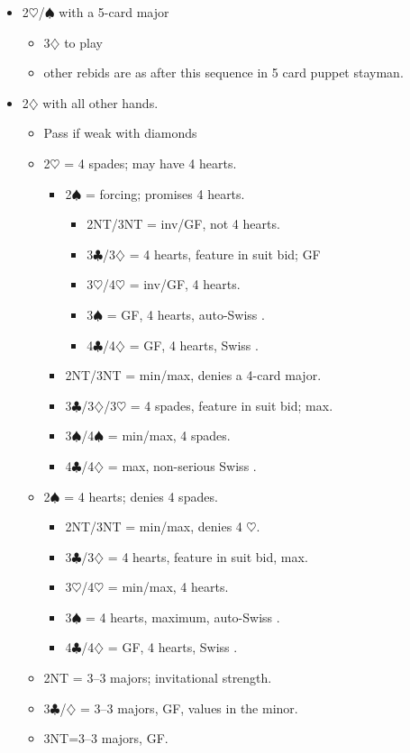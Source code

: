 \documentclass[a4paper,14pt]{extarticle}
\begin{document}
	\begin{itemize}
	\item 2$\heartsuit$/$\spadesuit$ with a 5-card major
		\begin{itemize}
		\item 3$\diamondsuit$ to play
		\item other rebids are as after this sequence in 5 card puppet stayman.
		\end{itemize}
\newpage
	\item 2$\diamondsuit$ with all other hands. 
		\begin{itemize}
		\item Pass if weak with diamonds
		\item 2$\heartsuit$ = 4 spades; may have 4 hearts.
			\begin{itemize}
			\item 2$\spadesuit$ = forcing; promises 4 hearts.
				\begin{itemize}
				\item 2NT/3NT = inv/GF, not 4 hearts.
				\item 3$\clubsuit$/3$\diamondsuit$ = 4 hearts, feature in suit bid; GF
				\item 3$\heartsuit$/4$\heartsuit$ = inv/GF, 4 hearts.
				\item 3$\spadesuit$ = GF, 4 hearts, auto-Swiss .
				\item 4$\clubsuit$/4$\diamondsuit$ = GF, 4 hearts, Swiss .
				\end{itemize}
			\item 2NT/3NT = min/max, denies a 4-card major.
			\item 3$\clubsuit$/3$\diamondsuit$/3$\heartsuit$ = 4 spades, feature in suit bid; max.
			\item 3$\spadesuit$/4$\spadesuit$ = min/max, 4 spades.
			\item 4$\clubsuit$/4$\diamondsuit$ = max, non-serious Swiss .
			\end{itemize}

		\item 2$\spadesuit$ = 4 hearts; denies 4 spades.
			\begin{itemize}
			\item 2NT/3NT = min/max, denies 4 $\heartsuit$.
			\item 3$\clubsuit$/3$\diamondsuit$ = 4 hearts, feature in suit bid, max.
			\item 3$\heartsuit$/4$\heartsuit$ = min/max, 4 hearts.
			\item 3$\spadesuit$ = 4 hearts, maximum, auto-Swiss .
			\item 4$\clubsuit$/4$\diamondsuit$ = GF, 4 hearts, Swiss .
			\end{itemize}

		\item 2NT = 3--3 majors; invitational strength.
		\item 3$\clubsuit$/$\diamondsuit$ = 3--3 majors, GF, values in the minor.
		\item 3NT=3--3 majors, GF.
		\end{itemize}
	\end{itemize}
\end{document}
